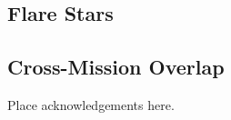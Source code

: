 \documentclass[preprint]{aastex}
\begin{document}
\subsection{Flare Stars}

\subsection{Cross-Mission Overlap}

\acknowledgements
Place acknowledgements here.

\begin{thebibliography}{}

\end{thebibliography}


\clearpage




\clearpage

\end{document}
